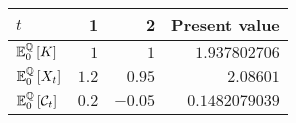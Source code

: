 \documentclass[main.tex]{subfiles}
\begin{document}
            \begin{table}[H]
                \centering
                \begin{tabular}{l|rr||r}
                    $t$ & 1 & 2 & Present value \\
                    \hline
                    \rule{0pt}{1.1em}
                    $\mathbb{E}_{0}^{\mathbb{Q}}\left[K\right]$ & $\num{1}$ & $\num{1}$ & $\num{1.937802706}$ \\
                    \rule{0pt}{1.1em}
                    $\mathbb{E}_{0}^{\mathbb{Q}}\left[X_t\right]$ & $\num{1.2}$ & $\num{0.95}$ & $\num{2.08601}$ \\
                    \rule{0pt}{1.1em}
                    $\mathbb{E}_{0}^{\mathbb{Q}}\left[\mathcal{C}_t\right]$ & $\num{0.2}$ & $\num{-0.05}$ & $\num{0.1482079039}$ \\
                \end{tabular}
                \caption{}
                \label{tbl:swap-legs}
            \end{table}
\end{document}
